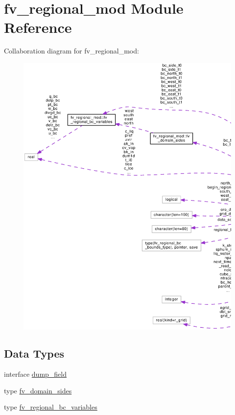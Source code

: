 \section{fv\-\_\-regional\-\_\-mod Module Reference}
\label{classfv__regional__mod}


Collaboration diagram for fv\-\_\-regional\-\_\-mod\-:
\nopagebreak
\begin{figure}[H]
\begin{center}
\leavevmode
\includegraphics[width=350pt]{classfv__regional__mod__coll__graph}
\end{center}
\end{figure}
\subsection*{Data Types}
\begin{DoxyCompactItemize}
\item 
interface \hyperlink{interfacefv__regional__mod_1_1dump__field}{dump\-\_\-field}
\item 
type \hyperlink{structfv__regional__mod_1_1fv__domain__sides}{fv\-\_\-domain\-\_\-sides}
\item 
type \hyperlink{structfv__regional__mod_1_1fv__regional__bc__variables}{fv\-\_\-regional\-\_\-bc\-\_\-variables}
\end{DoxyCompactItemize}

